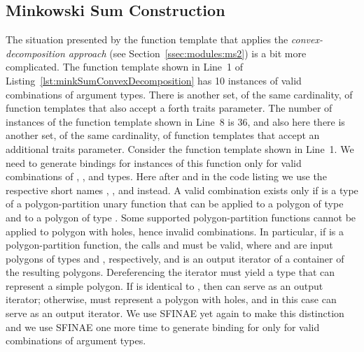 \subsection{Minkowski Sum Construction}
\label{sec:code:minkSumComputation}
The situation presented by the function template  that applies the \emph{convex-decomposition approach} (see Section~\ref{ssec:modules:ms2}) is a bit more complicated. The function template shown in Line~1 of Listing~\ref{lst:minkSumConvexDecomposition} has 10 instances of valid combinations of argument types. There is another set, of the same cardinality, of function templates that also accept a forth traits parameter. The number of instances of the function template shown in Line~8 is 36, and also here there is another set, of the same cardinality, of function templates that accept an additional traits parameter. Consider the function template shown in Line~1. We need to generate bindings for instances of this function only for valid combinations of , , and  types. Here after and in the code listing we use the respective short names , , and  instead. A valid combination exists only if  is a type of a polygon-partition unary function that can be applied to a polygon of type  and to a polygon of type . Some supported polygon-partition functions cannot be applied to polygon with holes, hence invalid combinations. In particular, if  is a polygon-partition function, the calls  and  must be valid, where  and  are input polygons of types  and , respectively, and  is an output iterator of a container of the resulting polygons. Dereferencing the iterator must yield a type that can represent a simple polygon. If  is identical to , then  can serve as an output iterator; otherwise,  must represent a polygon with holes, and in this case  can serve as an output iterator. We use SFINAE yet again to make this distinction and we use SFINAE one more time to generate binding for  only for valid combinations of argument types.

